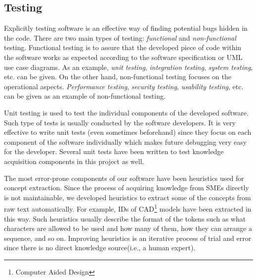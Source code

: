 \subsection{Testing}

Explicitly testing software is an effective way of finding potential bugs hidden in the code. 
There are two main types of testing: \textit{functional} and \textit{non-functional} testing. 
Functional testing is to 
assure that the developed piece of code within the software works as expected according to the software 
specification or UML use case diagrams. As an example, \textit{unit testing}, 
\textit{integration testing}, \textit{system testing}, etc. can be given. On the other hand, 
non-functional testing focuses on the operational aspects. \textit{Performance testing}, \textit{security 
testing}, \textit{usability testing}, etc. can be given as an example of non-functional testing.

Unit testing is used to test the individual components of the developed software. Such type of tests is 
usually conducted by the software developers. It is very effective to write unit tests (even sometimes 
beforehand) since they focus on each component of the software individually which makes future debugging 
very easy for the developer. Several unit tests have been written to test knowledge acquisition components 
in this project as well.

The most error-prone components of our software have been heuristics used for concept extraction. Since 
the process of acquiring knowledge from SMEs directly is not maintainable, we developed heuristics to 
extract some of the concepts from raw text automatically. For example, IDs of CAD\footnote{Computer Aided 
Design} models have been extracted in this way. Such heuristics usually describe the format of the 
tokens such as what characters are allowed to be used and how many of them, how they can arrange a 
sequence, and so on. Improving heuristics is an iterative process of trial and error since there is 
no direct knowledge source(i.e., a human expert).

